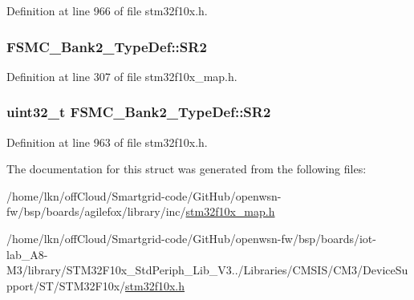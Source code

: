 Definition at line 966 of file stm32f10x.\+h.

\subsubsection[{\texorpdfstring{S\+R2}{SR2}}]{ F\+S\+M\+C\+\_\+\+Bank2\+\_\+\+Type\+Def\+::\+S\+R2}\hypertarget{struct_f_s_m_c___bank2___type_def_a5223b1e5429e9186ae2d89ddd55414e7}{}\label{struct_f_s_m_c___bank2___type_def_a5223b1e5429e9186ae2d89ddd55414e7}


Definition at line 307 of file stm32f10x\+\_\+map.\+h.

\subsubsection[{\texorpdfstring{S\+R2}{SR2}}]{ {\bf uint32\+\_\+t} F\+S\+M\+C\+\_\+\+Bank2\+\_\+\+Type\+Def\+::\+S\+R2}\hypertarget{struct_f_s_m_c___bank2___type_def_a38ad7403e05c899dc266cf47f932cc8f}{}\label{struct_f_s_m_c___bank2___type_def_a38ad7403e05c899dc266cf47f932cc8f}


Definition at line 963 of file stm32f10x.\+h.



The documentation for this struct was generated from the following files\+:\begin{DoxyCompactItemize}
\item 
/home/lkn/off\+Cloud/\+Smartgrid-\/code/\+Git\+Hub/openwsn-\/fw/bsp/boards/agilefox/library/inc/\hyperlink{agilefox_2library_2inc_2stm32f10x__map_8h}{stm32f10x\+\_\+map.\+h}\item 
/home/lkn/off\+Cloud/\+Smartgrid-\/code/\+Git\+Hub/openwsn-\/fw/bsp/boards/iot-\/lab\+\_\+\+A8-\/\+M3/library/\+S\+T\+M32\+F10x\+\_\+\+Std\+Periph\+\_\+\+Lib\+\_\+\+V3../\+Libraries/\+C\+M\+S\+I\+S/\+C\+M3/\+Device\+Support/\+S\+T/\+S\+T\+M32\+F10x/\hyperlink{iot-lab___a8-_m3_2library_2_s_t_m32_f10x___std_periph___lib___v3_85_80_2_libraries_2_c_m_s_i_s_26497265545392eb5694b064ae15018db}{stm32f10x.\+h}\end{DoxyCompactItemize}
